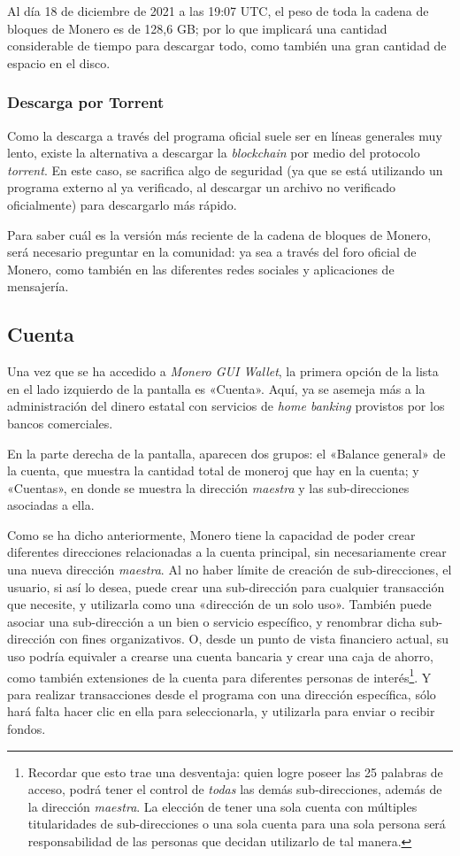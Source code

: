 \documentclass[12pt,a4paper,twoside]{book}
\begin{document}
Al día 18 de diciembre de 2021 a las 19:07 UTC, el peso de toda la cadena de bloques de Monero es de 128,6 GB; por lo que implicará una cantidad considerable de tiempo para descargar todo, como también una gran cantidad de espacio en el disco.

\subsubsection{Descarga por Torrent}
Como la descarga a través del programa oficial suele ser en líneas generales muy lento, existe la alternativa a descargar la \textit{blockchain} por medio del protocolo \textit{torrent}. En este caso, se sacrifica algo de seguridad (ya que se está utilizando un programa externo al ya verificado, al descargar un archivo no verificado oficialmente) para descargarlo más rápido.

Para saber cuál es la versión más reciente de la cadena de bloques de Monero, será necesario preguntar en la comunidad: ya sea a través del foro oficial de Monero, como también en las diferentes redes sociales y aplicaciones de mensajería.

\subsection{Cuenta}
Una vez que se ha accedido a \textit{Monero GUI Wallet}, la primera opción de la lista en el lado izquierdo de la pantalla es «Cuenta». Aquí, ya se asemeja más a la administración del dinero estatal con servicios de \textit{home banking} provistos por los bancos comerciales.

En la parte derecha de la pantalla, aparecen dos grupos: el «Balance general» de la cuenta, que muestra la cantidad total de moneroj que hay en la cuenta; y «Cuentas», en donde se muestra la dirección \textit{maestra} y las sub-direcciones asociadas a ella.

Como se ha dicho anteriormente, Monero tiene la capacidad de poder crear diferentes direcciones relacionadas a la cuenta principal, sin necesariamente crear una nueva dirección \textit{maestra}. Al no haber límite de creación de sub-direcciones, el usuario, si así lo desea, puede crear una sub-dirección para cualquier transacción que necesite, y utilizarla como una «dirección de un solo uso». También puede asociar una sub-dirección a un bien o servicio específico, y renombrar dicha sub-dirección con fines organizativos. O, desde un punto de vista financiero actual, su uso podría equivaler a crearse una cuenta bancaria y crear una caja de ahorro, como también extensiones de la cuenta para diferentes personas de interés\footnote{Recordar que esto trae una desventaja: quien logre poseer las 25 palabras de acceso, podrá tener el control de \textit{todas} las demás sub-direcciones, además de la dirección \textit{maestra}. La elección de tener una sola cuenta con múltiples titularidades de sub-direcciones o una sola cuenta para una sola persona será responsabilidad de las personas que decidan utilizarlo de tal manera.}. Y para realizar transacciones desde el programa con una dirección específica, sólo hará falta hacer clic en ella para seleccionarla, y utilizarla para enviar o recibir fondos.
\end{document}
